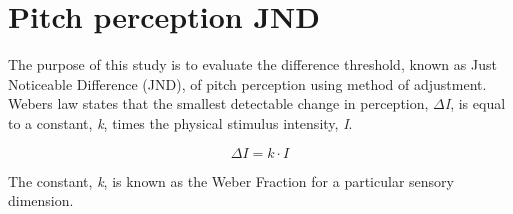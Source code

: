 \chapter*{Pitch perception JND}
The purpose of this study is to evaluate the difference threshold, known as Just Noticeable Difference (JND), of pitch perception using method of adjustment. Webers law states that the smallest detectable change in perception, $\Delta$\textit{I}, is equal to a constant, \textit{k}, times the physical stimulus intensity, \textit{I}.

\begin{equation}
\Delta I= k \cdot I
\end{equation}

The constant, \textit{k}, is known as the Weber Fraction for a particular sensory dimension.